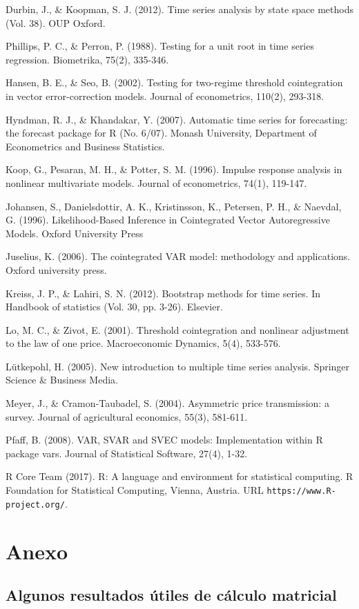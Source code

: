 \documentclass[12pt, twoside]{book}\usepackage[]{graphicx}\usepackage[]{color}
\numberwithin{equation}{section}
\numberwithin{theorem}{section}
\numberwithin{teorema}{section}
\numberwithin{defi}{section}
\numberwithin{prop}{section}
\numberwithin{defi}{section}
\theoremstyle{plain}
\begin{document}
Durbin, J., \& Koopman, S. J. (2012). Time series analysis by state space methods (Vol. 38). OUP Oxford.

Phillips, P. C., \& Perron, P. (1988). Testing for a unit root in time series regression. Biometrika, 75(2), 335-346.

Hansen, B. E., \& Seo, B. (2002). Testing for two-regime threshold cointegration in vector error-correction models. Journal of econometrics, 110(2), 293-318.

Hyndman, R. J., \& Khandakar, Y. (2007). Automatic time series for forecasting: the forecast package for R (No. 6/07). Monash University, Department of Econometrics and Business Statistics.

Koop, G., Pesaran, M. H., \& Potter, S. M. (1996). Impulse response analysis in nonlinear multivariate models. Journal of econometrics, 74(1), 119-147.

Johansen, S., Danielsdottir, A. K., Kristinsson, K., Petersen, P. H., \& Naevdal, G. (1996). Likelihood-Based Inference in Cointegrated Vector Autoregressive Models. Oxford University Press

Juselius, K. (2006). The cointegrated VAR model: methodology and applications. Oxford university press.

Kreiss, J. P., \& Lahiri, S. N. (2012). Bootstrap methods for time series. In Handbook of statistics (Vol. 30, pp. 3-26). Elsevier.

Lo, M. C., \& Zivot, E. (2001). Threshold cointegration and nonlinear adjustment to the law of one price. Macroeconomic Dynamics, 5(4), 533-576.

Lütkepohl, H. (2005). New introduction to multiple time series analysis. Springer Science \& Business Media.

Meyer, J., \& Cramon‐Taubadel, S. (2004). Asymmetric price transmission: a survey. Journal of agricultural economics, 55(3), 581-611.

 Pfaff, B. (2008). VAR, SVAR and SVEC models: Implementation within R package vars. Journal of Statistical Software, 27(4), 1-32.

R Core Team (2017). R: A language and environment for statistical computing.
  R Foundation for Statistical Computing, Vienna, Austria. URL
  \texttt{https://www.R-project.org/}.

  
\chapter{Anexo}
\section{Algunos resultados útiles de cálculo matricial}
\end{document}
